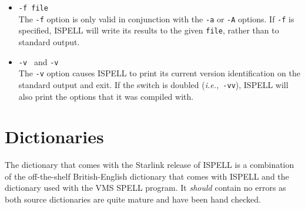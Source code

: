 \documentclass[noabs,nolof,twoside,11pt]{starlink}
\begin{document}
\begin{itemize}
To summarize these:

\begin{itemize}

   \item \verb+*+ Add to personal dictionary.
   \item \verb+@+ Accept word, but leave out of dictionary.
   \item \verb+#+ Save current personal dictionary.
   \item \verb+~+ Set parameters based on filename.
   \item \verb=+= Enter \TeX\ mode.
   \item \verb+-+ Exit \TeX\ mode.
   \item \verb+!+ Enter terse mode.
   \item \verb+%+ Exit terse mode.
   \item \verb+^+ Spell-check rest of line.

\end{itemize}

In terse mode, ISPELL will not print lines beginning with \verb-*+-, or
\verb+-+, all of which indicate correct words.
This significantly improves running speed when the driving program is going to
ignore correct words anyway.

\item {\Large\tt -f file} \\
The \verb+-f+ option is only valid in conjunction with the \verb+-a+ or
\verb+-A+ options.
If \verb+-f+ is specified, ISPELL will write its results to the given
\verb+file+, rather than to standard output.

\item {\Large\tt -v } and {\Large\tt -v } \\
The \verb+-v+ option causes ISPELL to print its current version identification
on the standard output and exit.
If the switch is doubled ({\it{i.e.,}}\ \verb+-vv+), ISPELL will also print the
options that it was compiled with.

\end{itemize}

\section{Dictionaries}

The dictionary that comes with the Starlink release of ISPELL is a combination
of the off-the-shelf British-English dictionary that comes with ISPELL and the
dictionary used with the VMS SPELL program.  It \emph{should} contain no errors
as both source dictionaries are quite mature and have been hand checked.
\end{document}
